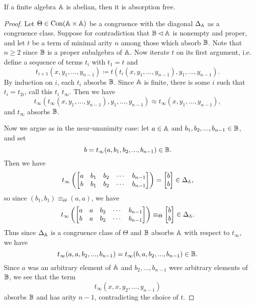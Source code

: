 \documentclass[letterpaper,11pt]{article}
\DeclareMathOperator{\Con}{Con}
\begin{document}
\begin{thm}\label{abelian-haf} If a finite algebra $\mathbb{A}$ is abelian, then it is absorption free.
\end{thm}
\begin{proof} Let $\Theta \in \Con(\bA \times \bA)$ be a congruence with the diagonal $\Delta_{\mathbb{A}}$ as a congruence class. Suppose for contradiction that $\mathbb{B} \lhd \mathbb{A}$ is nonempty and proper, and let $t$ be a term of minimal arity $n$ among those which absorb $\mathbb{B}$. Note that $n \ge 2$ since $\mathbb{B}$ is a proper subalgebra of $\mathbb{A}$. Now iterate $t$ on its first argument, i.e. define a sequence of terms $t_i$ with $t_1 = t$ and
\[
t_{i+1}(x,y_1, ..., y_{n-1}) \coloneqq t(t_i(x,y_1,...,y_{n-1}),y_1,...,y_{n-1}).
\]
By induction on $i$, each $t_i$ absorbs $\mathbb{B}$. Since $\mathbb{A}$ is finite, there is some $i$ such that $t_i = t_{2i}$, call this $t_i$ $t_\infty$. Then we have
\[
t_\infty(t_\infty(x,y_1, ..., y_{n-1}),y_1, ..., y_{n-1}) \approx t_\infty(x,y_1, ..., y_{n-1}),
\]
and $t_\infty$ absorbs $\mathbb{B}$.

Now we argue as in the near-unanimity case: let $a \in \mathbb{A}$ and $b_1,b_2,...,b_{n-1} \in \mathbb{B}$, and set
\[
b = t_\infty(a,b_1,b_2,...,b_{n-1}) \in \mathbb{B}.
\]
Then we have
\[
t_\infty\left(\begin{bmatrix} a & b_1 & b_2 & \cdots & b_{n-1}\\ b & b_1 & b_2 & \cdots & b_{n-1}\end{bmatrix}\right) = \begin{bmatrix} b\\ b\end{bmatrix} \in \Delta_{\mathbb{A}},
\]
so since $(b_1,b_1) \equiv_\Theta (a,a)$, we have
\[
t_\infty\left(\begin{bmatrix} a & a & b_2 & \cdots & b_{n-1}\\ b & a & b_2 & \cdots & b_{n-1}\end{bmatrix}\right) \equiv_\Theta \begin{bmatrix} b\\ b\end{bmatrix} \in \Delta_{\mathbb{A}}.
\]
Thus since $\Delta_{\mathbb{A}}$ is a congruence class of $\Theta$ and $\mathbb{B}$ absorbs $\mathbb{A}$ with respect to $t_\infty$, we have
\[
t_{\infty}(a,a,b_2,...,b_{n-1}) = t_\infty(b,a,b_2,...,b_{n-1}) \in \mathbb{B}.
\]
Since $a$ was an arbitrary element of $\mathbb{A}$ and $b_2, ..., b_{n-1}$ were arbitrary elements of $\mathbb{B}$, we see that the term
\[
t_\infty(x,x,y_2,...,y_{n-1})
\]
absorbs $\mathbb{B}$ and has arity $n-1$, contradicting the choice of $t$.
\end{proof}
\end{document}
